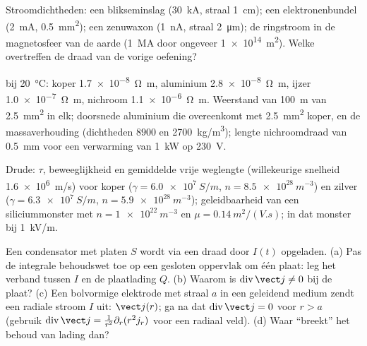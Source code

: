 \begin{exercise}[$\star$]\label{exo:b2:charges-currents-conduction:2}
Stroomdichtheden: een blikseminslag (\qty{30}{kA}, straal \qty{1}{cm}); een
elektronenbundel (\qty{2}{mA}, \qty{0.5}{mm^2}); een zenuwaxon (\qty{1}{nA},
straal \qty{2}{\micro m}); de ringstroom in de magnetosfeer van de aarde
(\qty{1}{MA} door ongeveer \qty{1e14}{m^2}). Welke overtreffen de draad van
de vorige oefening?
\end{exercise}

\begin{exercise}[$\star$]\label{exo:b2:charges-currents-conduction:3}
 bij \qty{20}{\degreeCelsius}: koper
\qty{1.7e-8}{\ohm.m}, aluminium \qty{2.8e-8}{\ohm.m}, ijzer
\qty{1.0e-7}{\ohm.m}, nichroom \qty{1.1e-6}{\ohm.m}. Weerstand van
\qty{100}{m} van \qty{2.5}{mm^2} in elk; doorsnede aluminium die overeenkomt
met \qty{2.5}{mm^2} koper, en de massaverhouding (dichtheden $8900$ en
\qty{2700}{kg/m^3}); lengte nichroomdraad van \qty{0.5}{mm} voor een
verwarming van \qty{1}{kW} op \qty{230}{V}.
\end{exercise}

\begin{exercise}[$\star$]\label{exo:b2:charges-currents-conduction:4}
Drude: $\tau$, beweeglijkheid en gemiddelde vrije weglengte (willekeurige
snelheid \qty{1.6e6}{m/s}) voor koper ($\gamma = \qty{6.0e7}{S/m}$,
$n = \qty{8.5e28}{m^{-3}}$) en zilver ($\gamma = \qty{6.3e7}{S/m}$,
$n = \qty{5.9e28}{m^{-3}}$); geleidbaarheid van een siliciummonster met
$n = \qty{1e22}{m^{-3}}$ en $\mu = \qty{0.14}{m^2/(V.s)}$;  in
dat monster bij \qty{1}{kV/m}.
\end{exercise}

\begin{exercise}[$\star\star$]\label{exo:b2:charges-currents-conduction:5}
Een condensator met platen $S$ wordt via een draad door $I(t)$ opgeladen.
(a) Pas de integrale behoudswet toe op een gesloten oppervlak om één plaat:
leg het verband tussen $I$ en de plaatlading $Q$. (b) Waarom is
$\operatorname{div}\vect j \ne 0$ bij de plaat? (c) Een bolvormige elektrode
met straal $a$ in een geleidend medium zendt een radiale stroom $I$ uit:
$\vect j(r)$; ga na dat $\operatorname{div}
\vect j = 0$ voor $r > a$
(gebruik $\operatorname{div}\vect j = \frac1{r^2}\partial_r(r^2j_r)$ voor
een radiaal veld). (d) Waar ``breekt'' het behoud van lading dan?
\end{exercise}


